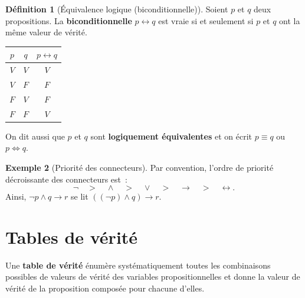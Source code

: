 \documentclass[12pt,a4paper,openany]{book}
\theoremstyle{definition}
\newtheorem{definition}{Définition}[chapter]
\newtheorem{exemple}[definition]{Exemple}
\theoremstyle{plain}
\theoremstyle{remark}
\begin{document}
\begin{definition}[\'Equivalence logique (biconditionnelle)]\label{def:equivalence}
  Soient $p$ et $q$ deux propositions. La \textbf{biconditionnelle} $p \leftrightarrow q$\index{$\leftrightarrow$} est vraie si et seulement si $p$ et $q$ ont la m\^eme valeur de v\'erit\'e.

  \medskip
  \begin{center}
  \begin{tabular}{cc|c}
    \toprule
    $p$ & $q$ & $p \leftrightarrow q$ \\ \midrule
    $V$ & $V$ & $V$ \\
    $V$ & $F$ & $F$ \\
    $F$ & $V$ & $F$ \\
    $F$ & $F$ & $V$ \\
    \bottomrule
  \end{tabular}
  \end{center}

  On dit aussi que $p$ et $q$ sont \textbf{logiquement \'equivalentes} et on \'ecrit $p \equiv q$\index{$\equiv$} ou $p \Leftrightarrow q$.
\end{definition}

\begin{exemple}[Priorit\'e des connecteurs]\label{ex:priorite}
  Par convention, l'ordre de priorit\'e d\'ecroissante des connecteurs est~:
  \[
    \neg \quad > \quad \land \quad > \quad \lor \quad > \quad \to \quad > \quad \leftrightarrow.
  \]
  Ainsi, $\neg p \land q \to r$ se lit $((\neg p) \land q) \to r$.
\end{exemple}

\section{Tables de v\'erit\'e}
\label{sec:tables-verite}

Une \textbf{table de v\'erit\'e} \'enum\`ere syst\'ematiquement toutes les combinaisons possibles de valeurs de v\'erit\'e des variables propositionnelles et donne la valeur de v\'erit\'e de la proposition compos\'ee pour chacune d'elles.
\end{document}
